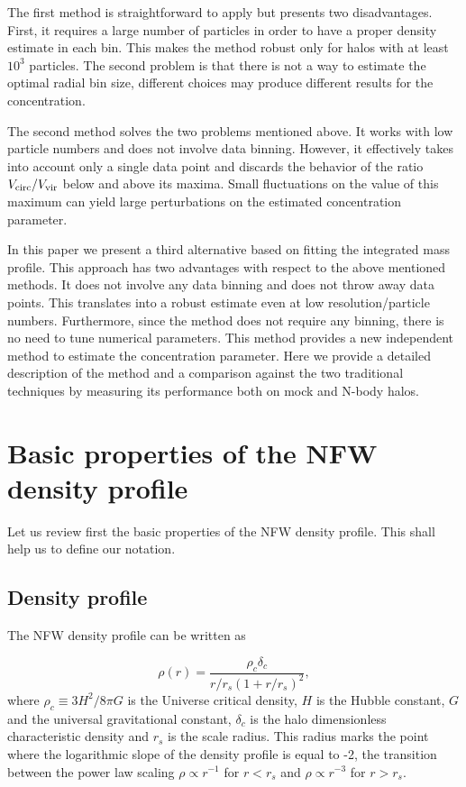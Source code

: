 \documentclass[a4,useAMS,usenatbib,usegraphicx]{mn2e}
\begin{document}
The first method is straightforward to apply but presents two
disadvantages.  
First, it requires a large number of particles in
order to have a proper density estimate in each bin.  
This makes the method robust only for halos with at least $10^3$ particles.  
The second problem is that there is not a way to estimate the optimal
radial bin size, different choices may produce different results for the
concentration.

The second method solves the two problems mentioned above.  
It works with low particle numbers and does not involve data binning.  
However, it effectively takes into account only a single data point and
discards the behavior of the ratio $V_{\rm circ}/V_{\rm vir}$ below
and above its maxima.  
Small fluctuations on the value of this maximum can yield large
perturbations on the estimated concentration parameter.  

In this paper we present a third alternative based on fitting the
integrated mass profile.
This approach has two advantages with respect to the above mentioned
methods.  
It does not involve any data binning and does not throw away data
points. 
This translates into a robust estimate even at low resolution/particle
numbers.   
Furthermore, since the method does not require any binning, there is
no need to tune numerical parameters.
This method provides a new independent method to estimate the
concentration parameter.   
Here we provide a detailed description of the method and a
comparison against the two traditional techniques by measuring its
performance both on mock and N-body halos.


\section{Basic properties of the NFW density profile}
\label{sec:basics}

Let us review first the basic properties of the NFW density profile.
This shall help us to define our notation.

\subsection{Density profile}

The NFW density profile can be written as

\begin{equation}
\rho(r) = \frac{\rho_c\delta_c}{r/r_s(1+r/r_s)^2},
\label{eq:definition}
\end{equation}
%
where $\rho_c\equiv 3H^2/8\pi G$ is the Universe critical density, $H$
is the Hubble constant, $G$ and the universal gravitational constant,
$\delta_c$ is the halo dimensionless characteristic density and $r_s$
is the scale radius. 
This radius marks the point where the logarithmic slope of the density
profile is equal to -2, the transition between the power law
scaling $\rho\propto r^{-1}$ for $r<r_s$ and $\rho\propto r^{-3}$ for
$r>r_s$. 
\end{document}
